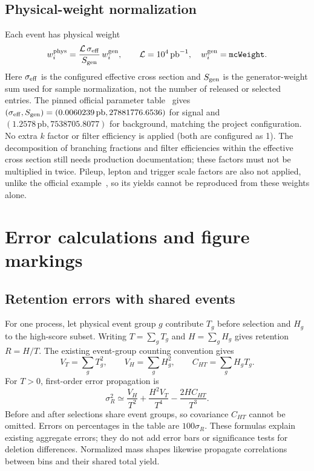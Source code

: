 \documentclass[11pt,a4paper]{article}
\begin{document}
\subsection{Physical-weight normalization}\label{app:weights}
Each event has physical weight
\[
 w_i^{\rm phys}=\frac{\mathcal L\,\sigma_{\rm eff}}{S_{\rm gen}}\,w_i^{\rm gen},
 \qquad \mathcal L=10^4\,\mathrm{pb}^{-1},\quad w_i^{\rm gen}=\texttt{mcWeight}.
\]
Here $\sigma_{\rm eff}$ is the configured effective cross section and $S_{\rm gen}$ is the generator-weight sum used for sample normalization, not the number of released or selected entries.
The pinned official parameter table~\cite{SampleInfo} gives
$(\sigma_{\rm eff},S_{\rm gen})=(0.0060239\,\mathrm{pb},27881776.6536)$ for signal and $(1.2578\,\mathrm{pb},7538705.8077)$ for background, matching the project configuration.
No extra $k$ factor or filter efficiency is applied (both are configured as 1).
The decomposition of branching fractions and filter efficiencies within the effective cross section still needs production documentation; these factors must not be multiplied in twice.
Pileup, lepton and trigger scale factors are also not applied, unlike the official example~\cite{HZZAnalysis}, so its yields cannot be reproduced from these weights alone.
\FloatBarrier

\section{Error calculations and figure markings}\label{app:errors}

\subsection{Retention errors with shared events}
For one process, let physical event group $g$ contribute $T_g$ before selection and $H_g$ to the high-score subset.
Writing $T=\sum_g T_g$ and $H=\sum_g H_g$ gives retention $R=H/T$.
The existing event-group counting convention gives
\[
 V_T=\sum_g T_g^2,\qquad V_H=\sum_g H_g^2,\qquad C_{HT}=\sum_g H_gT_g.
\]
For $T>0$, first-order error propagation is
\[
 \sigma_R^2\simeq\frac{V_H}{T^2}+\frac{H^2V_T}{T^4}-\frac{2H C_{HT}}{T^3}.
\]
Before and after selections share event groups, so covariance $C_{HT}$ cannot be omitted.
Errors on percentages in the table are $100\sigma_R$.
These formulas explain existing aggregate errors; they do not add error bars or significance tests for deletion differences.
Normalized mass shapes likewise propagate correlations between bins and their shared total yield.
\end{document}
